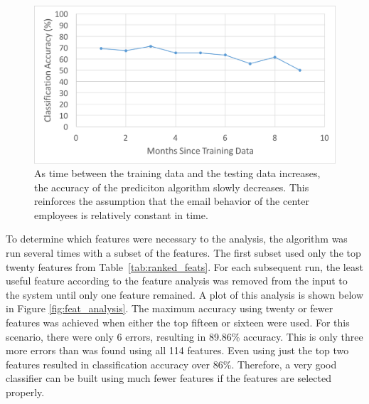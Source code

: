 \documentclass[12pt]{report}
\begin{document}
\begin{figure}[t]
    \centering
        \includegraphics[width=.8\columnwidth,trim={0mm 0mm 0mm 0mm},clip]{TimeGapsAnalysis}
        \vspace{-7pt}
        \caption[Accuracy of classification over time]{As time between the training data and the testing data increases, the accuracy of the prediciton algorithm slowly decreases.  This reinforces the assumption that the email behavior of the center employees is relatively constant in time.}
        \label{fig:time_analysis}
\end{figure}

To determine which features were necessary to the analysis, the algorithm was run several times with a subset of the features.
The first subset used only the top twenty features from Table~\ref{tab:ranked_feats}.
For each subsequent run, the least useful feature according to the feature analysis was removed from the input to the system until only one feature remained.
A plot of this analysis is shown below in Figure \ref{fig:feat_analysis}.
The maximum accuracy using twenty or fewer features was achieved when either the top fifteen or sixteen were used.
For this scenario, there were only 6 errors, resulting in 89.86\% accuracy.
This is only three more errors than was found using all 114 features.
Even using just the top two features resulted in classification accuracy over 86\%.
Therefore, a very good classifier can be built using much fewer features if the features are selected properly.
\end{document}
